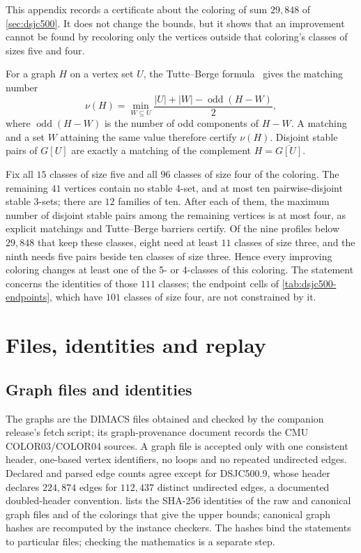 \documentclass[11pt]{article}
\theoremstyle{definition}
\newcommand{\DSJCFiveHundred}{\textnormal{\textsc{DSJC500.9}}}
\newcommand{\odd}{\operatorname{odd}}
\begin{document}
This appendix records a certificate about the coloring of sum $29{,}848$ of
\cref{sec:dsjc500}. It does not change the bounds, but it shows that an improvement
cannot be found by recoloring only the vertices outside that coloring's
classes of sizes five and four.

For a graph $H$ on a vertex set $U$, the Tutte--Berge
formula~\cite{lovasz2009} gives the matching number
\begin{equation}
\label{eq:tutte-berge}
  \nu(H)=\min_{W\subseteq U}\frac{|U|+|W|-\odd(H-W)}{2},
\end{equation}
where $\odd(H-W)$ is the number of odd components of $H-W$. A matching and a
set $W$ attaining the same value therefore certify $\nu(H)$. Disjoint stable
pairs of $G[U]$ are exactly a matching of the complement
$H=\overline{G[U]}$.

Fix all $15$ classes of size five and all $96$ classes of size four of the
coloring. The remaining $41$ vertices contain no stable 4-set, and at most
ten pairwise-disjoint stable 3-sets; there are $12$ families of ten. After
each of them, the maximum number of disjoint stable pairs among the remaining
vertices is at most four, as explicit matchings and Tutte--Berge barriers
certify. Of the nine profiles below $29{,}848$ that keep these classes, eight
need at least $11$ classes of size three, and the ninth needs five pairs
beside ten classes of size three. Hence every improving coloring changes at
least one of the 5- or 4-classes of this coloring. The statement concerns
the identities of those $111$ classes; the endpoint cells of
\cref{tab:dsjc500-endpoints}, which have $101$ classes of size four, are not
constrained by it.

\section{Files, identities and replay}
\label{app:files}

\subsection{Graph files and identities}

The graphs are the DIMACS files obtained and checked by the companion
release's fetch script; its graph-provenance document records the CMU
COLOR03/COLOR04 sources. A graph file is accepted only with one consistent
header, one-based vertex identifiers, no loops and no repeated undirected
edges. Declared and parsed edge counts agree except for \DSJCFiveHundred{},
whose header declares $224{,}874$ edges for $112{,}437$ distinct undirected
edges, a documented doubled-header convention.  lists the
SHA-256 identities of the raw and canonical graph files and of the colorings
that give the upper bounds; canonical graph hashes are recomputed by the
instance checkers. The hashes bind the statements to particular files;
checking the mathematics is a separate step.
\end{document}
